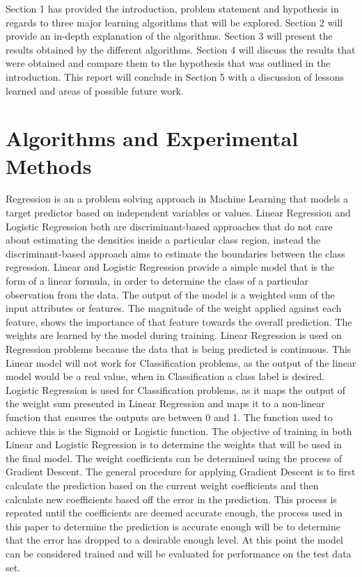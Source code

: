 \documentclass[twoside,11pt]{article}
\begin{document}
\hspace*{5mm} Section 1 has provided the introduction, problem statement and hypothesis in regards to three major learning algorithms that will be explored. Section 2 will provide an in-depth explanation of the algorithms. Section 3 will present the results obtained by the different algorithms. Section 4 will discuss the results that were obtained and compare them to the hypothesis that was outlined in the introduction. This report will conclude in Section 5 with a discussion of lessons learned and areas of possible future work.\\


\section{Algorithms and Experimental Methods}
\hspace*{10mm} Regression is an a problem solving approach in Machine Learning that models a target predictor based on independent variables or values.  Linear Regression and Logistic Regression both are discriminant-based approaches that do not care about estimating the densities inside a particular class region, instead the discriminant-based approach aims to estimate the boundaries between the class regression. Linear and Logistic Regression provide a simple model that is the form of a linear formula, in order to determine the class of a particular observation from the data. The output of the model is a weighted sum of the input attributes or features. The magnitude of the weight applied against each feature, shows the importance of that feature towards the overall prediction. The weights are learned by the model during training. Linear Regression is used on Regression problems because the data that is being predicted is continuous. This Linear model will not work for Classification problems, as the output of the linear model would be a real value, when in Classification a class label is desired. Logistic Regression is used for Classification problems, as it maps the output of the weight sum presented in Linear Regression and maps it to a non-linear function that ensures the outputs are between 0 and 1. The function used to achieve this is the Sigmoid or Logistic function.\newline
\hspace*{10mm} The objective of training in both Linear and Logistic Regression is to determine the weights that will be used in the final model. The weight coefficients can be determined using the process of Gradient Descent. The general procedure for applying Gradient Descent is to first calculate the prediction based on the current weight coefficients and then calculate new coefficients based off the error in the prediction. This process is repeated until the coefficients are deemed accurate enough, the process used in this paper to determine the prediction is accurate enough will be to determine that the error has dropped to a desirable enough level. At this point the model can be considered trained and will be evaluated for performance on the test data set.
\end{document}
